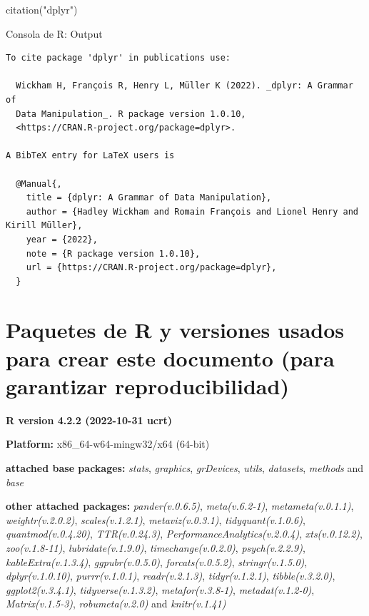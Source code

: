 \documentclass[
  bookmarksnumbered]{article}
\newenvironment{Shaded}{\begin{snugshade}}{\end{snugshade}}
\newcommand{\FunctionTok}[1]{\textcolor[rgb]{0.39,0.29,0.61}{#1}}
\newcommand{\NormalTok}[1]{\textcolor[rgb]{0.12,0.11,0.11}{#1}}
\newcommand{\StringTok}[1]{\textcolor[rgb]{0.75,0.01,0.01}{#1}}
\begin{document}
\begin{Shaded}
\begin{Highlighting}[]
\FunctionTok{citation}\NormalTok{(}\StringTok{"dplyr"}\NormalTok{)}
\end{Highlighting}
\end{Shaded}

\begin{ROut}{Consola de R: Output~\thetcbcounter}
                \begin{footnotesize}
                \begin{verbatim} 
To cite package 'dplyr' in publications use:

  Wickham H, François R, Henry L, Müller K (2022). _dplyr: A Grammar of
  Data Manipulation_. R package version 1.0.10,
  <https://CRAN.R-project.org/package=dplyr>.

A BibTeX entry for LaTeX users is

  @Manual{,
    title = {dplyr: A Grammar of Data Manipulation},
    author = {Hadley Wickham and Romain François and Lionel Henry and Kirill Müller},
    year = {2022},
    note = {R package version 1.0.10},
    url = {https://CRAN.R-project.org/package=dplyr},
  }
 \end{verbatim}
                \end{footnotesize}
                \end{ROut}

\hypertarget{paquetes-list}{%
\section{Paquetes de R y versiones usados para crear este documento (para garantizar reproducibilidad)}\label{paquetes-list}}

\textbf{R version 4.2.2 (2022-10-31 ucrt)}

\textbf{Platform:} x86\_64-w64-mingw32/x64 (64-bit)

\textbf{attached base packages:}
\emph{stats}, \emph{graphics}, \emph{grDevices}, \emph{utils}, \emph{datasets}, \emph{methods} and \emph{base}

\textbf{other attached packages:}
\emph{pander(v.0.6.5)}, \emph{meta(v.6.2-1)}, \emph{metameta(v.0.1.1)}, \emph{weightr(v.2.0.2)}, \emph{scales(v.1.2.1)}, \emph{metaviz(v.0.3.1)}, \emph{tidyquant(v.1.0.6)}, \emph{quantmod(v.0.4.20)}, \emph{TTR(v.0.24.3)}, \emph{PerformanceAnalytics(v.2.0.4)}, \emph{xts(v.0.12.2)}, \emph{zoo(v.1.8-11)}, \emph{lubridate(v.1.9.0)}, \emph{timechange(v.0.2.0)}, \emph{psych(v.2.2.9)}, \emph{kableExtra(v.1.3.4)}, \emph{ggpubr(v.0.5.0)}, \emph{forcats(v.0.5.2)}, \emph{stringr(v.1.5.0)}, \emph{dplyr(v.1.0.10)}, \emph{purrr(v.1.0.1)}, \emph{readr(v.2.1.3)}, \emph{tidyr(v.1.2.1)}, \emph{tibble(v.3.2.0)}, \emph{ggplot2(v.3.4.1)}, \emph{tidyverse(v.1.3.2)}, \emph{metafor(v.3.8-1)}, \emph{metadat(v.1.2-0)}, \emph{Matrix(v.1.5-3)}, \emph{robumeta(v.2.0)} and \emph{knitr(v.1.41)}
\end{document}
